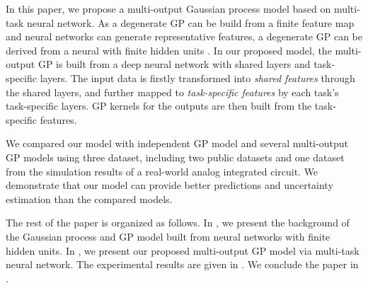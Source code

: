 In this paper, we propose a multi-output Gaussian process model based on multi-task neural network. As a degenerate GP can be build from a finite feature map and neural networks can generate representative features, a degenerate GP can be derived from a neural with finite hidden units \cite{lazaro2010marginalized, huang2015scalable}. In our proposed model, the multi-output GP is built from a deep neural network with shared layers and task-specific layers. The input data is firstly transformed into \emph{shared features} through the shared layers, and further mapped to \emph{task-specific features} by each task's task-specific layers. GP kernels for the outputs are then built from the task-specific features.

We compared our model with independent GP model and several multi-output GP models using three dataset, including two public datasets and one dataset from the simulation results of a real-world analog integrated circuit. We demonstrate that our model can provide better predictions and uncertainty estimation than the compared models.

The rest of the paper is organized as follows. In , we present the background of the Gaussian process and GP model built from neural networks with finite hidden units. In , we present our proposed multi-output GP model via multi-task neural network. The experimental results are given in . We conclude the paper in .

